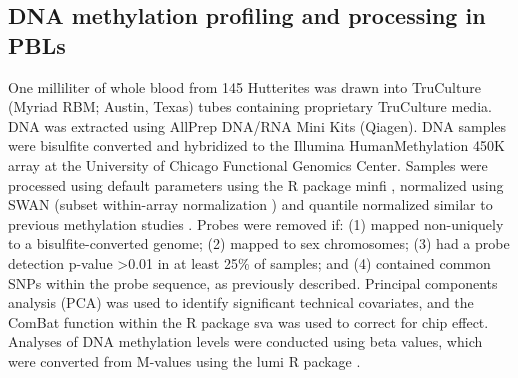 \subsection{DNA methylation profiling and processing in PBLs}\label{DNA methylation profiling and processing in PBLs}
One milliliter of whole blood from 145 Hutterites was drawn into TruCulture (Myriad RBM; Austin, Texas) tubes containing proprietary TruCulture media. DNA was extracted using AllPrep DNA/RNA Mini Kits (Qiagen). DNA samples were bisulfite converted and hybridized to the Illumina HumanMethylation 450K array at the University of Chicago Functional Genomics Center.  Samples were processed using default parameters using the R package minfi \citep{Aryee:2014by}, normalized using SWAN (subset within-array normalization \citep{Maksimovic:2012ib}) and quantile normalized similar to previous methylation studies \citep{NicodemusJohnson:2016go}.  Probes were removed if: (1) mapped non-uniquely to a bisulfite-converted genome; (2) mapped to sex chromosomes; (3) had a probe detection p-value \textgreater0.01 in at least 25\% of samples; and (4) contained common SNPs within the probe sequence, as previously described\citep{Banovich:2014bn}. Principal components analysis (PCA) was used to identify significant technical covariates, and the ComBat function \citep{Johnson:2007fp} within the R package sva \citep{Leek:2012ee} was used to correct for chip effect. Analyses of DNA methylation levels were conducted using beta values, which were converted from M-values using the lumi R package \citep{Du:2008ev}.






